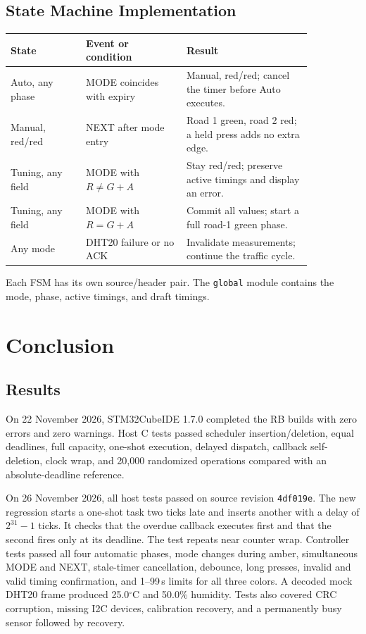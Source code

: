 \subsection{State Machine Implementation}
\begin{center}
\begin{tabular}{p{0.21\linewidth}|p{0.29\linewidth}|p{0.35\linewidth}}
State & Event or condition & Result\\ \hline
Auto, any phase & MODE coincides with expiry & Manual, red/red; cancel the timer before Auto executes.\\
Manual, red/red & NEXT after mode entry & Road 1 green, road 2 red; a held press adds no extra edge.\\
Tuning, any field & MODE with $R\ne G+A$ & Stay red/red; preserve active timings and display an error.\\
Tuning, any field & MODE with $R=G+A$ & Commit all values; start a full road-1 green phase.\\
Any mode & DHT20 failure or no ACK & Invalidate measurements; continue the traffic cycle.\\
\end{tabular}
\end{center}
Each FSM has its own source/header pair. The \texttt{global} module contains the mode, phase, active timings, and draft timings.

\section{Conclusion}
\subsection{Results}
On 22 November 2026, STM32CubeIDE 1.7.0 completed the RB builds with zero errors and zero warnings. Host C tests passed scheduler insertion/deletion, equal deadlines, full capacity, one-shot execution, delayed dispatch, callback self-deletion, clock wrap, and 20,000 randomized operations compared with an absolute-deadline reference.

On 26 November 2026, all host tests passed on source revision \texttt{4df019e}. The new regression starts a one-shot task two ticks late and inserts another with a delay of $2^{31}-1$ ticks. It checks that the overdue callback executes first and that the second fires only at its deadline. The test repeats near counter wrap.
Controller tests passed all four automatic phases, mode changes during amber, simultaneous MODE and NEXT, stale-timer cancellation, debounce, long presses, invalid and valid timing confirmation, and 1--99\,s limits for all three colors. A decoded mock DHT20 frame produced 25.0$^\circ$C and 50.0\% humidity. Tests also covered CRC corruption, missing I2C devices, calibration recovery, and a permanently busy sensor followed by recovery.

